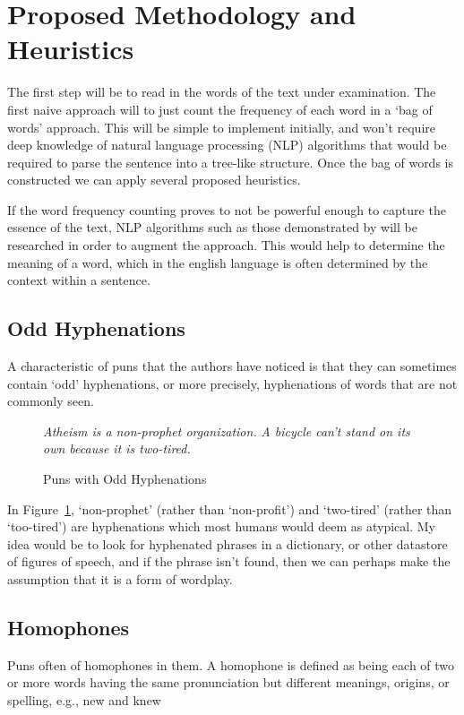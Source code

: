 
\section{Proposed Methodology and Heuristics}
The first step will be to read in the words of the text under examination. The first naive approach will to just count the frequency of each word in a `bag of words' approach. This will be simple to implement initially, and won't require deep knowledge of natural language processing (NLP) algorithms that would be required to parse the sentence into a tree-like structure. Once the bag of words is constructed we can apply several proposed heuristics.

If the word frequency counting proves to not be powerful enough to capture the essence of the text, NLP algorithms such as those demonstrated by \cite{stanfordparser} will be researched in order to augment the approach. This would help to determine the meaning of a word, which in the english language is often determined by the context within a sentence.

\subsection{Odd Hyphenations}
A characteristic of puns that the authors have noticed is that they can sometimes contain `odd' hyphenations, or more precisely, hyphenations of words that are not commonly seen.

\begin{figure}[h]
\begin{mdframed}
  \emph{Atheism is a non-prophet organization.}
  \emph{A bicycle can't stand on its own because it is two-tired.}
  \caption{Puns with Odd Hyphenations}
 \label{oddhyphen}
\end{mdframed}
\end{figure}

In Figure~\ref{oddhyphen}, `non-prophet' (rather than `non-profit') and `two-tired' (rather than `too-tired') are hyphenations which most humans would deem as atypical. My idea would be to look for hyphenated phrases in a dictionary, or other datastore of figures of speech, and if the phrase isn't found, then we can perhaps make the assumption that it is a form of wordplay. 

\subsection{Homophones}
Puns often of homophones in them. A homophone is defined as being each of two or more words having the same pronunciation but different meanings, origins, or spelling, e.g., new and knew

